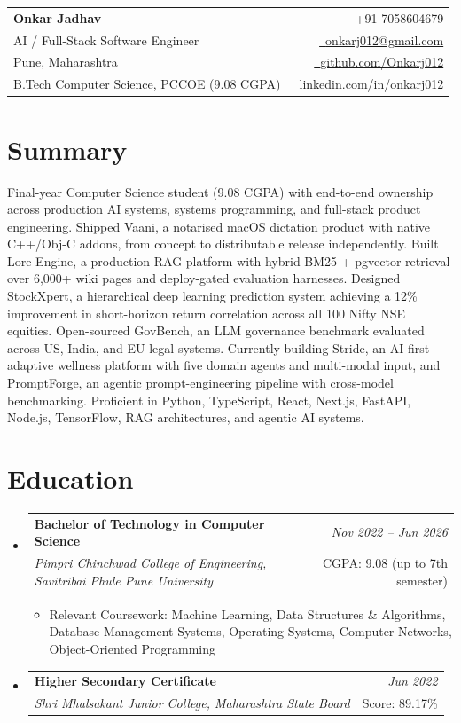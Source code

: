 \documentclass[a4paper,11pt]{article}
\makeatletter
\newcommand{\resumeSubheading}[4]{
\vspace{0.5mm}\item
    \begin{tabular*}{0.98\textwidth}[t]{l@{\extracolsep{\fill}}r}
        \textbf{#1} & \textit{\footnotesize{#4}} \\
        \textit{\footnotesize{#3}} & \footnotesize{#2}\\
    \end{tabular*}
    \vspace{-2.4mm}
}
\newcommand{\resumeSubHeadingListStart}{\begin{itemize}[leftmargin=*,labelsep=0mm]}
\newcommand{\resumeItemListStart}{\begin{justify}\begin{itemize}[leftmargin=3ex, rightmargin=2ex, noitemsep,labelsep=1.2mm,itemsep=0mm]\small}
\newcommand{\resumeSubHeadingListEnd}{\end{itemize}\vspace{2mm}}
\newcommand{\resumeItemListEnd}{\end{itemize}\end{justify}\vspace{-2mm}}
\newcommand{\name}{Onkar Jadhav}
\newcommand{\phone}{7058604679}
\newcommand{\emaila}{onkarj012@gmail.com}
\newcommand{\github}{github.com/Onkarj012}
\newcommand{\linkedin}{linkedin.com/in/onkarj012}
\makeatother
\begin{document}
\selectfont

\begin{tabularx}{\linewidth}{L r}
  \textbf{\Large \name} & {\raisebox{0.0\height}{\footnotesize \faPhone}\ +91-\phone}\\
  {AI / Full-Stack Software Engineer} & \href{mailto:\emaila}{\raisebox{0.0\height}{\footnotesize \faEnvelope}\ {\emaila}} \\
  {Pune, Maharashtra} & \href{https://\github}{\raisebox{0.0\height}{\footnotesize \faGithub}\ {\github}} \\
  {B.Tech Computer Science, PCCOE (9.08 CGPA)} & \href{https://\linkedin}{\raisebox{0.0\height}{\footnotesize \faLinkedin}\ {\linkedin}}
\end{tabularx}
\vspace{-4mm}

\section{\textbf{Summary}}
\vspace{1mm}
\small{
Final-year Computer Science student (9.08 CGPA) with end-to-end ownership across production AI systems, systems programming, and full-stack product engineering. Shipped Vaani, a notarised macOS dictation product with native C++/Obj-C addons, from concept to distributable release independently. Built Lore Engine, a production RAG platform with hybrid BM25 + pgvector retrieval over 6,000+ wiki pages and deploy-gated evaluation harnesses. Designed StockXpert, a hierarchical deep learning prediction system achieving a 12\% improvement in short-horizon return correlation across all 100 Nifty NSE equities. Open-sourced GovBench, an LLM governance benchmark evaluated across US, India, and EU legal systems. Currently building Stride, an AI-first adaptive wellness platform with five domain agents and multi-modal input, and PromptForge, an agentic prompt-engineering pipeline with cross-model benchmarking. Proficient in Python, TypeScript, React, Next.js, FastAPI, Node.js, TensorFlow, RAG architectures, and agentic AI systems.
}
\vspace{-3mm}

\section{\textbf{Education}}
  \resumeSubHeadingListStart
    \resumeSubheading
      {Bachelor of Technology in Computer Science}{CGPA: 9.08 (up to 7th semester)}
      {Pimpri Chinchwad College of Engineering, Savitribai Phule Pune University}{Nov 2022 -- Jun 2026}
      \resumeItemListStart
        \item {Relevant Coursework: Machine Learning, Data Structures \& Algorithms, Database Management Systems, Operating Systems, Computer Networks, Object-Oriented Programming}
      \resumeItemListEnd
    \resumeSubheading
      {Higher Secondary Certificate}{Score: 89.17\%}
      {Shri Mhalsakant Junior College, Maharashtra State Board}{Jun 2022}
  \resumeSubHeadingListEnd
\vspace{-5.5mm}
\end{document}
